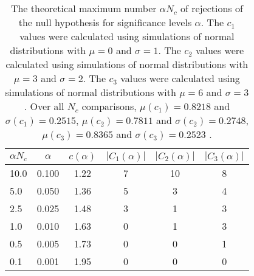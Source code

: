 \begin{table}[h!]
\begin{center}
\begin{tabular}{| l | c | c | c | c | c |}\hline
$\alpha N_c$ & $\alpha$ & $c(\alpha)$ & $|C_1(\alpha)|$ & $|C_2(\alpha)|$ & $|C_3(\alpha)|$ \\\hline\hline
10.0 & 0.100 & 1.22 & 7 & 10 & 8 \\\hline
5.0 & 0.050 & 1.36 & 5 & 3 & 4 \\\hline
2.5 & 0.025 & 1.48 & 3 & 1 & 3 \\\hline
1.0 & 0.010 & 1.63 & 0 & 1 & 3 \\\hline
0.5 & 0.005 & 1.73 & 0 & 0 & 1 \\\hline
0.1 & 0.001 & 1.95 & 0 & 0 & 0 \\\hline
\end{tabular}
\caption{The theoretical maximum number $\alpha N_c$ of rejections
of the null hypothesis for significance levels $\alpha$.
The $c_1$ values were calculated using simulations of normal distributions with $\mu=0$ and $\sigma=1$.
The $c_2$ values were calculated using simulations of normal distributions with $\mu=3$ and $\sigma=2$.
The $c_3$ values were calculated using simulations of normal distributions with $\mu=6$ and $\sigma=3$.
Over all $N_c$ comparisons,
 $\mu(c_1)=0.8218$ and $\sigma(c_1)=0.2515$,
 $\mu(c_2)=0.7811$ and $\sigma(c_2)=0.2748$,
 $\mu(c_3)=0.8365$ and $\sigma(c_3)=0.2523$ .
}
\end{center}
\end{table}